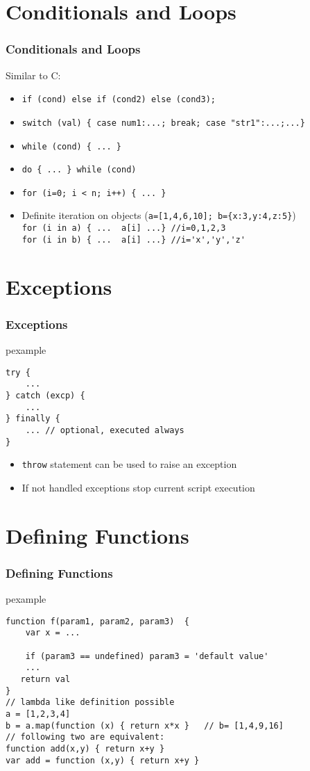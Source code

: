 \documentclass[trans,compress,xcolor=table]{beamer}
\begin{document}
\section{Conditionals and Loops}
\begin{frame}[fragile]
\frametitle{Conditionals and Loops}
Similar to C:
\begin{itemize}
\item \lstinline!if (cond) else if (cond2) else (cond3);!
\item \lstinline!switch (val) { case num1:...; break; case "str1":...;...}!
\item \lstinline!while (cond) { ... }!
\item \lstinline!do { ... } while (cond)!
\item \lstinline!for (i=0; i < n; i++) { ... }!
\item Definite iteration on objects (\lstinline!a=[1,4,6,10]; b={x:3,y:4,z:5}!)\\
\lstinline!for (i in a) { ...  a[i] ...} //i=0,1,2,3!\\
\lstinline!for (i in b) { ...  a[i] ...} //i='x','y','z'!\\
\end{itemize}
\end{frame}


\section{Exceptions}
\begin{frame}[fragile]
\frametitle{Exceptions}
\begin{beamercolorbox}{pexample}
\begin{lstlisting}
try {
    ...
} catch (excp) {
    ...
} finally {
    ... // optional, executed always
}
\end{lstlisting}
\end{beamercolorbox}
\begin{itemize}
\item \lstinline!throw! statement can be used to raise an exception
\item If not handled exceptions stop current script execution
\end{itemize}
\end{frame}

\section{Defining Functions}
\begin{frame}[fragile]
\frametitle{Defining Functions}
\begin{beamercolorbox}{pexample}
\begin{lstlisting}
function f(param1, param2, param3)  {
    var x = ...

    if (param3 == undefined) param3 = 'default value'
    ...
   return val
}
// lambda like definition possible
a = [1,2,3,4]
b = a.map(function (x) { return x*x }   // b= [1,4,9,16]
// following two are equivalent:
function add(x,y) { return x+y } 
var add = function (x,y) { return x+y }
\end{lstlisting}
\end{beamercolorbox}
\end{frame}
\end{document}
